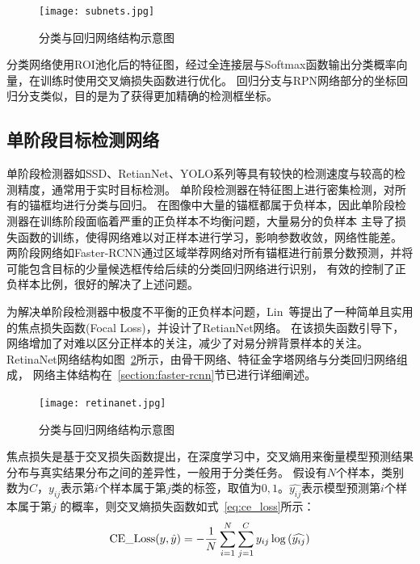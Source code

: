 \begin{figure}                  
  \centering                   
  \texttt{[image: subnets.jpg]}                   
  \caption{分类与回归网络结构示意图}                   
  \label{fig:subnets}      
\end{figure}   

分类网络使用ROI池化后的特征图，经过全连接层与Softmax函数输出分类概率向量，在训练时使用交叉熵损失函数进行优化。
回归分支与RPN网络部分的坐标回归分支类似，目的是为了获得更加精确的检测框坐标。

\subsection{单阶段目标检测网络}
单阶段检测器如SSD、RetianNet、YOLO系列等具有较快的检测速度与较高的检测精度，通常用于实时目标检测。
单阶段检测器在特征图上进行密集检测，对所有的锚框均进行分类与回归。
在图像中大量的锚框都属于负样本，因此单阶段检测器在训练阶段面临着严重的正负样本不均衡问题，大量易分的负样本
主导了损失函数的训练，使得网络难以对正样本进行学习，影响参数收敛，网络性能差。
两阶段网络如Faster-RCNN通过区域举荐网络对所有锚框进行前景分数预测，并将可能包含目标的少量候选框传给后续的分类回归网络进行识别，
有效的控制了正负样本比例，很好的解决了上述问题。

为解决单阶段检测器中极度不平衡的正负样本问题，Lin~\cite{lin2017focal}等提出了一种简单且实用的焦点损失函数(Focal Loss)，并设计了RetianNet网络。
在该损失函数引导下，网络增加了对难以区分正样本的关注，减少了对易分辨背景样本的关注。RetinaNet网络结构如图~\ref{fig:retinanet}所示，由骨干网络、特征金字塔网络与分类回归网络组成，
网络主体结构在~\ref{section:faster-rcnn}节已进行详细阐述。

\begin{figure}                     
  \centering                      
  \texttt{[image: retinanet.jpg]}                      
  \caption{分类与回归网络结构示意图}                      
  \label{fig:retinanet}       
\end{figure}   

焦点损失是基于交叉损失函数提出，在深度学习中，交叉熵用来衡量模型预测结果分布与真实结果分布之间的差异性，一般用于分类任务。
假设有$N$个样本，类别数为$C$，$y_{ij}$表示第$i$个样本属于第$j$类的标签，取值为$0, 1$。$\hat{y_{ij}}$表示模型预测第$i$个样本属于第$j$
的概率，则交叉熵损失函数如式~\ref{eq:ce_loss}所示：
\begin{equation}   
  {\rm{CE}}\_{\rm{Loss}}(y,\hat y) =  - \frac{1}{N}\sum\limits_{i = 1}^N {\sum\limits_{j = 1}^C {{y_{ij}}} } \log \left( {\widehat {{y_{ij}}}} \right)
  \label{eq:ce_loss} 
\end{equation}

